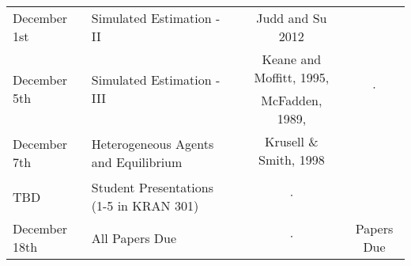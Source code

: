 \documentclass[a4paper]{article}
\begin{document}
\begin{table}[ht!]
\begin{tabular}{|l|l|c|c|}
\hline
\multirow{2}{*}{December 1st} & \multirow{2}{*}{Simulated Estimation - II} & \multirow{2}{*}{Judd and Su 2012} & \\
 &    &  &  \\
\hline
\multirow{2}{*}{December 5th} & \multirow{2}{*}{Simulated Estimation - III} &  Keane and Moffitt, 1995,  & \multirow{2}{*}{$\cdot$}\\
&   &  McFadden, 1989,  & \\
\hline
\multirow{2}{*}{December 7th} & \multirow{2}{*}{Heterogeneous Agents and Equilibrium} & Krusell \& Smith, 1998 & \\
 &  &  & \\
\hline
TBD & Student Presentations (1-5 in KRAN 301) & $\cdot$ & \\
\hline
December 18th & All Papers Due & $\cdot$ & Papers Due\\
\hline
\end{tabular}
\end{table}

\clearpage
\nocite{*}

\end{document}
